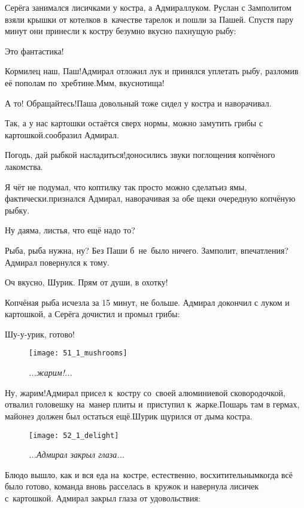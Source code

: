 Серёга занимался лисичками у костра, а Адмирал\mdash луком. Руслан с Замполитом взяли крышки от котелков в~качестве тарелок и пошли за Пашей. Спустя пару минут они принесли к костру безумно вкусно пахнущую рыбу:

\diagdash Это фантастика!

\diagdash Кормилец наш, Паш!\mdash Адмирал отложил лук и принялся уплетать рыбу, разломив её пополам по~хребтине.\mdash М\sdash м\sdash м, вкуснотища!

\diagdash А то! Обращайтесь!\mdash Паша довольный тоже сидел у костра и наворачивал.

\diagdash Так, а у нас картошки остаётся сверх нормы, можно замутить грибы с картошкой.\mdash сообразил Адмирал.

\diagdash Погодь, дай рыбкой насладиться!\mdash доносились звуки поглощения копчёного лакомства.

\diagdash Я чёт не подумал, что коптилку так просто можно сделать\mdash из ямы, фактически.\mdash признался Адмирал, наворачивая за обе щеки очередную копчёную рыбку.

\diagdash Ну да\mdash яма, листья, что ещё надо то?

\diagdash Рыба, рыба нужна, ну? Без Паши б~не~было ничего. Замполит, впечатления?\mdash Адмирал повернулся к тому.

\diagdash Оч вкусно, Шурик. Прям от души, в охотку!

Копчёная рыба исчезла за 15 минут, не больше. Адмирал докончил с луком и картошкой, а Серёга дочистил и промыл грибы:

\diagdash Шу-у-урик, готово!

\begin{wrapfigure}[12]{l}{0.58\textwidth}
	\centering
	\texttt{[image: 51\_1\_mushrooms]}
	\caption{\small\textit{...жарим!...}}
\end{wrapfigure}\diagdash Ну, жарим!\mdash Адмирал присел к~костру со~своей алюминиевой сковородочкой, отвалил головешку на~манер плиты и~приступил к~жарке.\mdash Пошарь там в гермах, майонез должен был остаться ещё.\mdash Шурик щурился от дыма костра.

\begin{wrapfigure}[11]{l}{0.58\textwidth}
	\centering
	\texttt{[image: 52\_1\_delight]}
	\caption{\small\textit{...Адмирал закрыл глаза...}}
\end{wrapfigure}
Блюдо вышло, как и вся еда на~костре, естественно, восхитительным\mdash когда всё было готово, команда вновь расселась в~кружок и навернула лисичек с~картошкой. Адмирал закрыл глаза от удовольствия:

